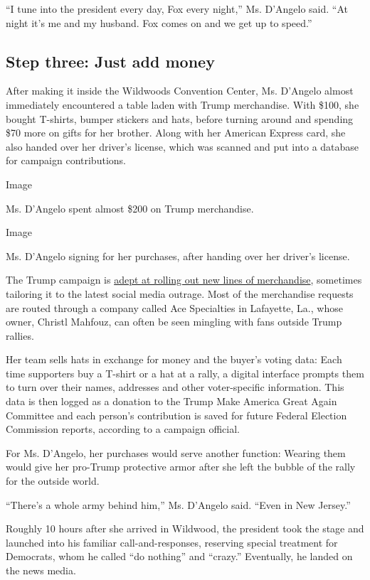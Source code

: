 ``I tune into the president every day, Fox every night,'' Ms. D'Angelo
said. ``At night it's me and my husband. Fox comes on and we get up to
speed.''

\hypertarget{step-three-just-add-money}{%
\subsection{Step three: Just add
money}\label{step-three-just-add-money}}

After making it inside the Wildwoods Convention Center, Ms. D'Angelo
almost immediately encountered a table laden with Trump merchandise.
With \$100, she bought T-shirts, bumper stickers and hats, before
turning around and spending \$70 more on gifts for her brother. Along
with her American Express card, she also handed over her driver's
license, which was scanned and put into a database for campaign
contributions.

Image

Ms. D'Angelo spent almost \$200 on Trump merchandise.

Image

Ms. D'Angelo signing for her purchases, after handing over her driver's
license.

The Trump campaign is
\href{https://www.nytimes.com/2019/09/13/us/politics/donald-trump-2020-campaign.html}{adept
at rolling out new lines of merchandise}, sometimes tailoring it to the
latest social media outrage. Most of the merchandise requests are routed
through a company called Ace Specialties in Lafayette, La., whose owner,
Christl Mahfouz, can often be seen mingling with fans outside Trump
rallies.

Her team sells hats in exchange for money and the buyer's voting data:
Each time supporters buy a T-shirt or a hat at a rally, a digital
interface prompts them to turn over their names, addresses and other
voter-specific information. This data is then logged as a donation to
the Trump Make America Great Again Committee and each person's
contribution is saved for future Federal Election Commission reports,
according to a campaign official.

For Ms. D'Angelo, her purchases would serve another function: Wearing
them would give her pro-Trump protective armor after she left the bubble
of the rally for the outside world.

``There's a whole army behind him,'' Ms. D'Angelo said. ``Even in New
Jersey.''

Roughly 10 hours after she arrived in Wildwood, the president took the
stage and launched into his familiar call-and-responses, reserving
special treatment for Democrats, whom he called ``do nothing'' and
``crazy.'' Eventually, he landed on the news media.

